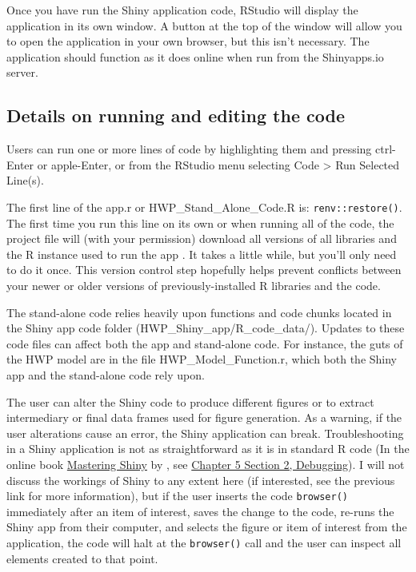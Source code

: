 \documentclass[
  openany]{book}
\begin{document}
Once you have run the Shiny application code, RStudio will display the application in its own window. A button at the top of the window will allow you to open the application in your own browser, but this isn't necessary. The application should function as it does online when run from the Shinyapps.io server.

\hypertarget{dnld-shiny-details}{%
\subsection{Details on running and editing the code}\label{dnld-shiny-details}}

Users can run one or more lines of code by highlighting them and pressing ctrl-Enter or apple-Enter, or from the RStudio menu selecting Code \textgreater{} Run Selected Line(s).

The first line of the app.r or HWP\_Stand\_Alone\_Code.R is: \texttt{renv::restore()}. The first time you run this line on its own or when running all of the code, the project file will (with your permission) download all versions of all libraries and the R instance used to run the app \autocite{R-renv}. It takes a little while, but you'll only need to do it once. This version control step hopefully helps prevent conflicts between your newer or older versions of previously-installed R libraries and the code.

The stand-alone code relies heavily upon functions and code chunks located in the Shiny app code folder (HWP\_Shiny\_app/R\_code\_data/). Updates to these code files can affect both the app and stand-alone code. For instance, the guts of the HWP model are in the file HWP\_Model\_Function.r, which both the Shiny app and the stand-alone code rely upon.

The user can alter the Shiny code to produce different figures or to extract intermediary or final data frames used for figure generation. As a warning, if the user alterations cause an error, the Shiny application can break. Troubleshooting in a Shiny application is not as straightforward as it is in standard R code (In the online book \href{https://mastering-shiny.org/index.html}{Mastering Shiny} by \textcite{wickham2021}, see \href{https://mastering-shiny.org/action-workflow.html}{Chapter 5 Section 2, Debugging}). I will not discuss the workings of Shiny to any extent here (if interested, see the previous link for more information), but if the user inserts the code \texttt{browser()} immediately after an item of interest, saves the change to the code, re-runs the Shiny app from their computer, and selects the figure or item of interest from the application, the code will halt at the \texttt{browser()} call and the user can inspect all elements created to that point.
\end{document}
